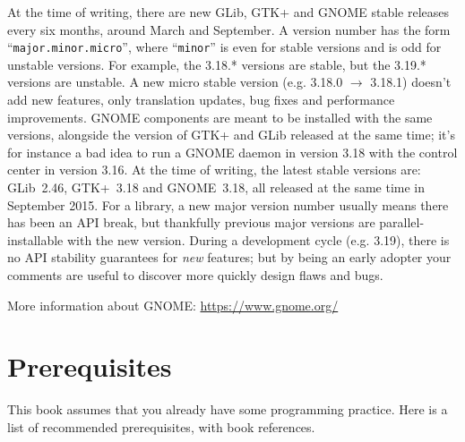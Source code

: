 At the time of writing, there are new GLib, GTK+ and GNOME stable releases every six months, around March and September. A version number has the form ``\texttt{major.minor.micro}'', where ``\texttt{minor}'' is even for stable versions and is odd for unstable versions. For example, the 3.18.* versions are stable, but the 3.19.* versions are unstable. A new micro stable version (e.g. 3.18.0 $\rightarrow$ 3.18.1) doesn't add new features, only translation updates, bug fixes and performance improvements. GNOME components are meant to be installed with the same versions, alongside the version of GTK+ and GLib released at the same time; it's for instance a bad idea to run a GNOME daemon in version 3.18 with the control center in version 3.16. At the time of writing, the latest stable versions are: GLib~2.46, GTK+~3.18 and GNOME~3.18, all released at the same time in September 2015. For a library, a new major version number usually means there has been an API break, but thankfully previous major versions are parallel-installable with the new version. During a development cycle (e.g. 3.19), there is no API stability guarantees for \emph{new} features; but by being an early adopter your comments are useful to discover more quickly design flaws and bugs.

More information about GNOME: \url{https://www.gnome.org/}

\section{Prerequisites}

This book assumes that you already have some programming practice. Here is a list of recommended prerequisites, with book references.

